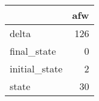 \begin{tabular}{lr}
\toprule
{} &  afw \\
\midrule
delta         &  126 \\
final\_state   &    0 \\
initial\_state &    2 \\
state         &   30 \\
\bottomrule
\end{tabular}
